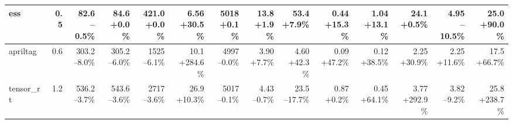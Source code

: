 \begin{table}[t]
{\begin{tabular}{lrrrrrrrrrrrrr}
\midrule
ess & 0.5 & \makecell[r]{82.6\\--0.5\%} & \makecell[r]{84.6\\+0.0\%} & \makecell[r]{421.0\\+0.0\%} & \makecell[r]{6.56\\+30.5\%} & \makecell[r]{5018\\+0.1\%} & \makecell[r]{13.8\\+1.9\%} & \makecell[r]{53.4\\+7.9\%} & \makecell[r]{0.44\\+15.3\%} & \makecell[r]{1.04\\+13.1\%} & \makecell[r]{24.1\\+0.5\%} & \makecell[r]{4.95\\--10.5\%} & \makecell[r]{25.0\\+90.0\%} \\
\midrule
apriltag & 0.6 & \makecell[r]{303.2\\--8.0\%} & \makecell[r]{305.2\\--6.0\%} & \makecell[r]{1525\\--6.1\%} & \makecell[r]{10.1\\+284.6\%} & \makecell[r]{4997\\--0.0\%} & \makecell[r]{3.90\\+7.7\%} & \makecell[r]{4.60\\+42.3\%} & \makecell[r]{0.09\\+47.2\%} & \makecell[r]{0.12\\+38.5\%} & \makecell[r]{2.25\\+30.9\%} & \makecell[r]{2.25\\+11.6\%} & \makecell[r]{17.5\\+66.7\%} \\
\midrule
tensor\_rt & 1.2 & \makecell[r]{536.2\\--3.7\%} & \makecell[r]{543.6\\--3.6\%} & \makecell[r]{2717\\--3.6\%} & \makecell[r]{26.9\\+10.3\%} & \makecell[r]{5017\\--0.1\%} & \makecell[r]{4.43\\--0.7\%} & \makecell[r]{23.5\\--17.7\%} & \makecell[r]{0.87\\+0.2\%} & \makecell[r]{0.45\\+64.1\%} & \makecell[r]{3.77\\+292.9\%} & \makecell[r]{3.82\\--9.2\%} & \makecell[r]{25.8\\+238.7\%} \\

\end{tabular}}
\end{table}
